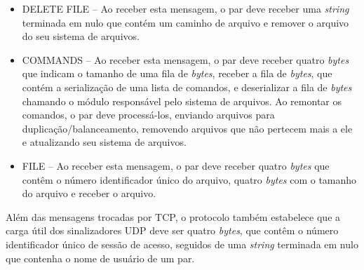 \documentclass{article}
\begin{document}
\begin{itemize}
	\item DELETE FILE -- Ao receber esta mensagem, o par deve receber uma \textit{string} terminada em nulo que contém um caminho de arquivo e remover o arquivo do seu sistema de arquivos.
	\item COMMANDS -- Ao receber esta mensagem, o par deve receber quatro \textit{bytes} que indicam o tamanho de uma fila de \textit{bytes}, receber a fila de \textit{bytes}, que contém a serialização de uma lista de comandos, e deserializar a fila de \textit{bytes} chamando o módulo responsável pelo sistema de arquivos. Ao remontar os comandos, o par deve processá-los, enviando arquivos para duplicação/balanceamento, removendo arquivos que não pertecem mais a ele e atualizando seu sistema de arquivos.
	\item FILE -- Ao receber esta mensagem, o par deve receber quatro \textit{bytes} que contêm o número identificador único do arquivo, quatro \textit{bytes} com o tamanho do arquivo e receber o arquivo.
\end{itemize}

Além das mensagens trocadas por TCP, o protocolo também estabelece que a carga útil dos sinalizadores UDP deve ser quatro \textit{bytes}, que contêm o número identificador único de sessão de acesso, seguidos de uma \textit{string} terminada em nulo que contenha o nome de usuário de um par.
\end{document}
